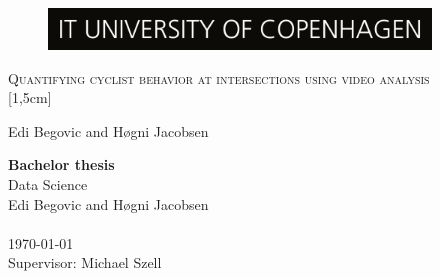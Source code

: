 \documentclass[
10pt, %
a4paper, %
oneside, %
headinclude,footinclude, %
] {book}%
\title{\normalfont\spacedallcaps{title}} %
\author{\spacedlowsmallcaps{author}} %
\date{\today} %
\begin{document}


\pagestyle{scrheadings} %



\hypersetup{pageanchor=false}
\begin{titlepage}
\thispagestyle{empty}
\begin{figure}[h!] %
\centering
\includegraphics[width=4in]{ITUlogo} 
\end{figure}

\begin{center}
\vspace{30 mm}
\begingroup \linespread{1,75} \selectfont 
\textsc{\LARGE Quantifying cyclist behavior at intersections using video analysis}\\
[1,5cm]
\endgroup

Edi Begovic and Høgni Jacobsen\\[2,5cm]

\end{center}
\vfill
\textbf{Bachelor thesis}\\  %
Data Science\\  
Edi Begovic and Høgni Jacobsen\\
\\
\today\\
Supervisor: Michael Szell
\end{titlepage}
\hypersetup{pageanchor=true}
\end{document}

